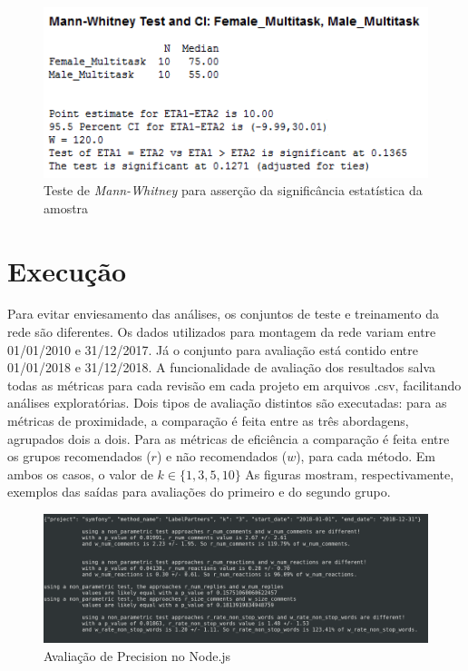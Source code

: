 \documentclass[12pt,openany,oneside,a4paper,english,brazil]{abntbibufjf}
\begin{document}
    \begin{figure}[H]
    \centering
      \includegraphics[width=\linewidth]{mann_whitney.png}
    \caption{Teste de \textit{Mann-Whitney} para asserção da significância estatística da amostra \cite{frost2013}}
    \label{fig:mannwhitney}
    \end{figure}


  \section{Execução}

  Para evitar enviesamento das análises, os conjuntos de teste e treinamento da rede são diferentes. Os dados utilizados para montagem da rede variam entre 01/01/2010  e 31/12/2017. Já o conjunto para avaliação está contido entre 01/01/2018 e 31/12/2018. A funcionalidade de avaliação dos resultados salva todas as métricas para cada revisão em cada projeto em arquivos .csv, facilitando análises exploratórias. Dois tipos de avaliação distintos são executadas: para as métricas de proximidade, a comparação é feita entre as três abordagens, agrupados dois a dois. Para as métricas de eficiência a comparação é feita entre os grupos recomendados ($r$) e não recomendados ($w$), para cada método. Em ambos os casos, o valor de $k \in \{1, 3, 5, 10\}$  As figuras mostram, respectivamente, exemplos das saídas para avaliações do primeiro e do segundo grupo.


  \begin{figure}[!htbp]
      \centering
      \includegraphics[width=\textwidth]{method-evaluation}
      \caption{Avaliação de Precision no Node.js}\label{fig:method-evaluation}
  \end{figure}
\end{document}
